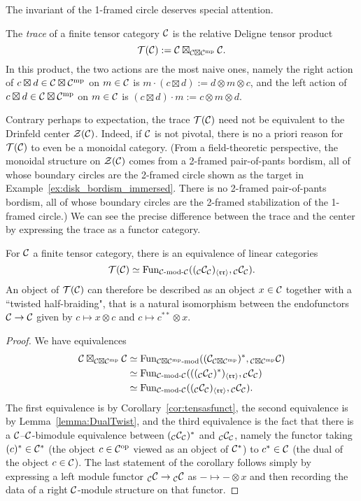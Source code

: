\documentclass{amsart}
\begin{document}
The invariant of the 1-framed circle deserves special attention.
\begin{definition}
The \emph{trace} of a finite tensor category $\mathcal C$ is the relative Deligne tensor product 
\[
\mathcal T(\mathcal C) := \mathcal C \boxtimes_{\mathcal C \boxtimes \mathcal C^{\mathrm{mp}}} \mathcal C.
\]
In this product, the two actions are the most naive ones, namely the right action of $c \boxtimes d \in \mathcal C \boxtimes \mathcal C^{\mathrm{mp}}$ on $m \in \mathcal C$ is $m \cdot (c \boxtimes d) := d \otimes m \otimes c$, and the left action of $c \boxtimes d \in \mathcal C \boxtimes \mathcal C^{\mathrm{mp}}$ on $m \in \mathcal C$ is $(c \boxtimes d) \cdot m := c \otimes m \otimes d$.
\end{definition}
Contrary perhaps to expectation, the trace $\mathcal T(\mathcal C)$ need not be equivalent to the Drinfeld center $\mathcal Z(\mathcal C)$.  Indeed, if $\mathcal C$ is not pivotal, there is no a priori reason for $\mathcal T(\mathcal C)$ to even be a monoidal category.  (From a field-theoretic perspective, the monoidal structure on $\mathcal Z(\mathcal C)$ comes from a 2-framed pair-of-pants bordism, all of whose boundary circles are the 2-framed circle shown as the target in Example~\ref{ex:disk_bordism_immersed}.  There is no 2-framed pair-of-pants bordism, all of whose boundary circles are the 2-framed stabilization of the 1-framed circle.)  We can see the precise difference between the trace and the center by expressing the trace as a functor category.
\begin{corollary}
For $\mathcal C$ a finite tensor category, there is an equivalence of linear categories
\[
\cT(\cC) \simeq \Fun_{\mod{\cC}{\cC}}(({}_\cC \cC_\cC)_{\langle \mathfrak{r r} \rangle},{}_\cC \cC_\cC).
\]
An object of $\mathcal T(\mathcal C)$ can therefore be described as an object $x \in \mathcal C$ together with a ``twisted half-braiding", that is a natural isomorphism between the endofunctors $\mathcal C \rightarrow \mathcal C$ given by $c \mapsto x \otimes c$ and $c \mapsto c^{**} \otimes x$.
\end{corollary}

\begin{proof}
We have equivalences
\begin{align*}
\cC \boxtimes_{\cC \boxtimes \cC^\mp} \cC
&\simeq
\Fun_{\mod{\cC \boxtimes \cC^\mp}{}}((\cC_{\cC \boxtimes \cC^\mp})^*,{}_{\cC \boxtimes \cC^\mp} \cC) \\
&\simeq
\Fun_{\mod{\cC}{\cC}}((({}_\cC \cC_\cC)^*)_{\langle \mathfrak{r r} \rangle},{}_\cC \cC_\cC) \\
&\simeq
\Fun_{\mod{\cC}{\cC}}(({}_\cC \cC_\cC)_{\langle \mathfrak{r r} \rangle},{}_\cC \cC_\cC).
\end{align*}
The first equivalence is by Corollary~\ref{cor:tensasfunct}, the second equivalence is by Lemma~\ref{lemma:DualTwist}, and the third equivalence is the fact that there is a $\mathcal C$--$\mathcal C$-bimodule equivalence between $({}_\mathcal C \mathcal C_\mathcal C)^*$ and ${}_\mathcal C \mathcal C_\mathcal C$, namely the functor taking $(c)^* \in \mathcal C^*$ (the object $c \in \mathcal C^{\mathrm{op}}$ viewed as an object of $\mathcal C^*$) to $c^* \in \mathcal C$ (the dual of the object $c \in \mathcal C$).  The last statement of the corollary follows simply by expressing a left module functor ${}_\mathcal C \mathcal C \rightarrow {}_\mathcal C \mathcal C$ as $- \mapsto - \otimes x$ and then recording the data of a right $\mathcal C$-module structure on that functor.
\end{proof}
\end{document}
